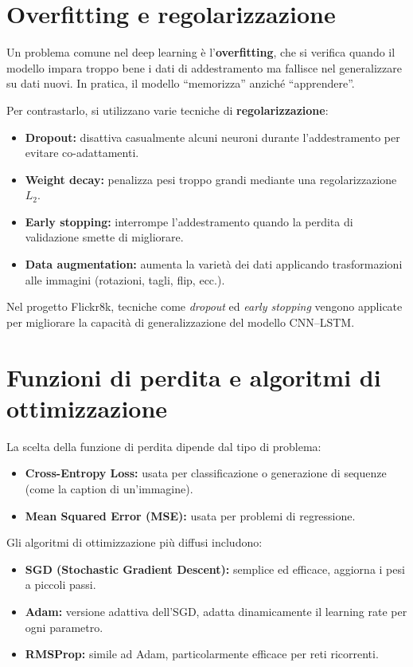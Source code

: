 \documentclass[11pt,a4paper]{report}
\begin{document}
\section{Overfitting e regolarizzazione}

Un problema comune nel deep learning è l’\textbf{overfitting}, che si verifica quando il modello impara troppo bene i dati di addestramento ma fallisce nel generalizzare su dati nuovi.  
In pratica, il modello “memorizza” anziché “apprendere”.

Per contrastarlo, si utilizzano varie tecniche di \textbf{regolarizzazione}:
\begin{itemize}
  \item \textbf{Dropout:} disattiva casualmente alcuni neuroni durante l’addestramento per evitare co-adattamenti.
  \item \textbf{Weight decay:} penalizza pesi troppo grandi mediante una regolarizzazione $L_2$.
  \item \textbf{Early stopping:} interrompe l’addestramento quando la perdita di validazione smette di migliorare.
  \item \textbf{Data augmentation:} aumenta la varietà dei dati applicando trasformazioni alle immagini (rotazioni, tagli, flip, ecc.).
\end{itemize}

\begin{tcolorbox}[title=Nota pratica]
Nel progetto Flickr8k, tecniche come \emph{dropout} ed \emph{early stopping} vengono applicate per migliorare la capacità di generalizzazione del modello CNN–LSTM.
\end{tcolorbox}

\section{Funzioni di perdita e algoritmi di ottimizzazione}

La scelta della funzione di perdita dipende dal tipo di problema:
\begin{itemize}
  \item \textbf{Cross-Entropy Loss:} usata per classificazione o generazione di sequenze (come la caption di un’immagine).
  \item \textbf{Mean Squared Error (MSE):} usata per problemi di regressione.
\end{itemize}

Gli algoritmi di ottimizzazione più diffusi includono:
\begin{itemize}
  \item \textbf{SGD (Stochastic Gradient Descent):} semplice ed efficace, aggiorna i pesi a piccoli passi.
  \item \textbf{Adam:} versione adattiva dell’SGD, adatta dinamicamente il learning rate per ogni parametro.
  \item \textbf{RMSProp:} simile ad Adam, particolarmente efficace per reti ricorrenti.
\end{itemize}
\end{document}
